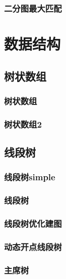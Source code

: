 \subsubsection{二分图最大匹配}


\section{数据结构}
\subsection{树状数组}
\subsubsection{树状数组}


\subsubsection{树状数组2}


\subsection{线段树}
\subsubsection{线段树simple}

\subsubsection{线段树}


\subsubsection{线段树优化建图}


\subsubsection{动态开点线段树}

\subsubsection{主席树}


